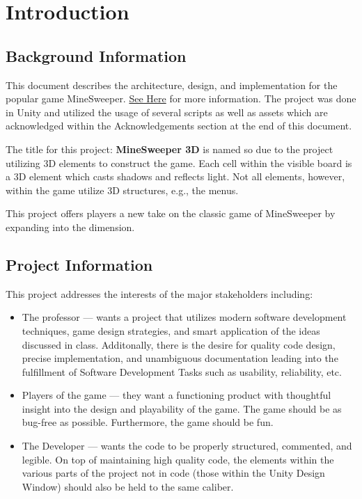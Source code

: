 \section{Introduction}
\label{sec:Intro}

\subsection{Background Information}
\label{subsec:BackgroundInfo}

This document describes the architecture, design, and implementation for the popular game MineSweeper.
\href{https://en.wikipedia.org/wiki/Minesweeper_(video_game)}{See Here} for more information.
The project was done in Unity and utilized the usage of several scripts as well as assets which are acknowledged within the Acknowledgements section at the end of this document.

The title for this project: \textbf{MineSweeper 3D} is named so due to the project utilizing 3D elements to construct the game.
Each cell within the visible board is a 3D element which casts shadows and reflects light.
Not all elements, however, within the game utilize 3D structures, e.g., the menus.

This project offers players a new take on the classic game of MineSweeper by expanding into the  dimension.

\subsection{Project Information}
\label{subsec:ProjInfo}

This project addresses the interests of the major stakeholders including:
\begin{itemize}
    \item The professor --- wants a project that utilizes modern software development techniques, game design strategies, and smart application of the ideas discussed in class.
    Additonally, there is the desire for quality code design, precise implementation, and unambiguous documentation leading into the fulfillment of Software Development Tasks such as usability, reliability, etc.
    \item Players of the game --- they want a functioning product with thoughtful insight into the design and playability of the game. The game should be as bug-free as possible. Furthermore, the game should be fun.
    \item The Developer --- wants the code to be properly structured, commented, and legible. 
    On top of maintaining high quality code, the elements within the various parts of the project not in code (those within the Unity Design Window) should also be held to the same caliber.
\end{itemize}

